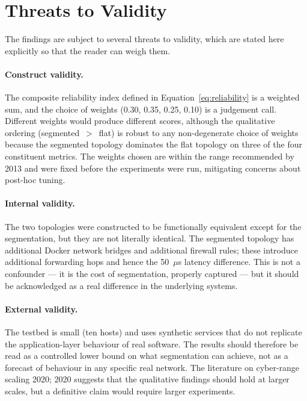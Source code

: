 \section{Threats to Validity}

The findings are subject to several threats to validity, which are stated here explicitly so that the reader can weigh them.

\paragraph{Construct validity.} The composite reliability index defined in Equation~\ref{eq:reliability} is a weighted sum, and the choice of weights (0.30, 0.35, 0.25, 0.10) is a judgement call. Different weights would produce different scores, although the qualitative ordering (segmented~$>$~flat) is robust to any non-degenerate choice of weights because the segmented topology dominates the flat topology on three of the four constituent metrics. The weights chosen are within the range recommended by \textcite{Cherdantseva and Hilton}{2013} and were fixed before the experiments were run, mitigating concerns about post-hoc tuning.

\paragraph{Internal validity.} The two topologies were constructed to be functionally equivalent except for the segmentation, but they are not literally identical. The segmented topology has additional Docker network bridges and additional firewall rules; these introduce additional forwarding hops and hence the 50~$\mu$s latency difference. This is not a confounder --- it is the cost of segmentation, properly captured --- but it should be acknowledged as a real difference in the underlying systems.

\paragraph{External validity.} The testbed is small (ten hosts) and uses synthetic services that do not replicate the application-layer behaviour of real software. The results should therefore be read as a controlled lower bound on what segmentation can achieve, not as a forecast of behaviour in any specific real network. The literature on cyber-range scaling \parencite{Yamin, Katt and Gkioulos}{2020}; \parencite{Russo, Costa and Armando}{2020} suggests that the qualitative findings should hold at larger scales, but a definitive claim would require larger experiments.


